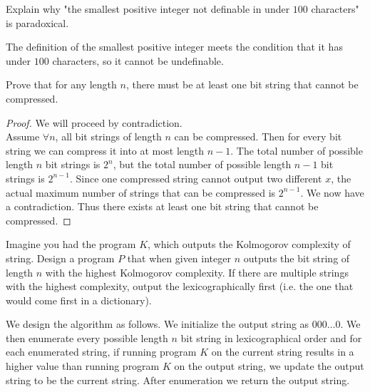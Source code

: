 \documentclass[11pt]{article}
\begin{document}
\newpage
{}

\begin{Parts}

    \Part Explain why "the smallest positive integer not definable in under $100$ characters" is paradoxical.

    \begin{Answer}
        The definition of the smallest positive integer meets the condition that it has under $100$ characters, so it cannot be undefinable. 
    \end{Answer}

    \Part Prove that for any length $n$, there must be at least one bit string that cannot be compressed.

    \begin{Answer}
        \begin{proof}
            We will proceed by contradiction. \\
            Assume $\forall n$, all bit strings of length $n$ can be compressed. Then for every bit string we can compress it into at most 
            length $n - 1$. The total number of possible length $n$ bit strings is $2^n$, but the total number of possible length $n-1$ bit 
            strings is $2^{n-1}$. Since one compressed string cannot output two different $x$, the actual maximum number of strings that can 
            be compressed is $2^{n-1}$. We now have a contradiction. Thus there exists at least one bit string that cannot be compressed. 
        \end{proof}
    \end{Answer}

    \Part Imagine you had the program $K$, which outputs the Kolmogorov complexity of string. Design a program $P$ that when given integer 
          $n$ outputs the bit string of length $n$ with the highest Kolmogorov complexity. If there are multiple strings with the highest 
          complexity, output the lexicographically first (i.e. the one that would come first in a dictionary).

    \begin{Answer}
        We design the algorithm as follows. We initialize the output string as $000\ldots0$. We then enumerate every possible length $n$ 
        bit string in lexicographical order and for each enumerated string, if running program $K$ on the current string results in a higher 
        value than running program $K$ on the output string, we update the output string to be the current string. After enumeration we 
        return the output string. 
    \end{Answer}


\end{Parts}
\end{document}
